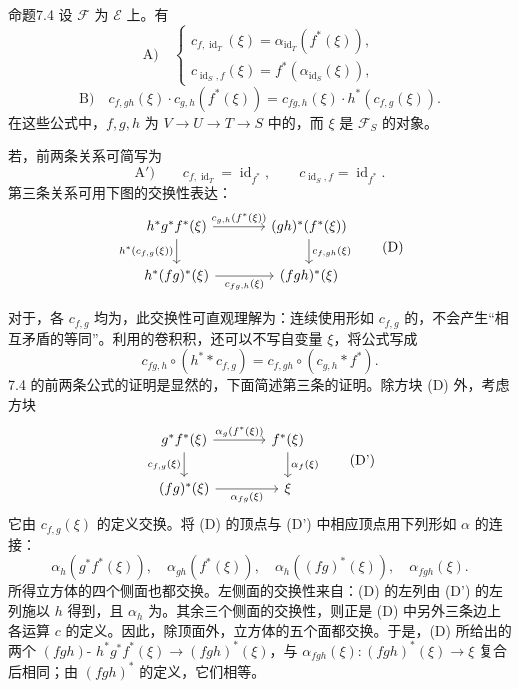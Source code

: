 \begin{SGAresult}{命题}{7.4}
设 $\mathcal F$ 为 $\mathcal E$ 上。有
\[
 \mathrm{A)}\quad
 \begin{cases}
 c_{f,\operatorname{id}_T}(\xi)=\alpha_{\operatorname{id}_T}(f^*(\xi)),\\
 c_{\operatorname{id}_S,f}(\xi)=f^*(\alpha_{\operatorname{id}_S}(\xi)),
 \end{cases}
\]
\[
 \mathrm{B)}\quad c_{f,gh}(\xi)\cdot c_{g,h}(f^*(\xi))
 =c_{fg,h}(\xi)\cdot h^*(c_{f,g}(\xi)).
\]
在这些公式中，$f,g,h$ 为 $V\to U\to T\to S$ 中的，而 $\xi$ 是 $\mathcal F_S$ 的对象。
\end{SGAresult}
若，前两条关系可简写为
\[
 \mathrm{A')}\qquad c_{f,\operatorname{id}_T}=\operatorname{id}_{f^*},\qquad
 c_{\operatorname{id}_S,f}=\operatorname{id}_{f^*}.
\]
第三条关系可用下图的交换性表达：
\[
\begin{tikzcd}[column sep=large]
 h^*g^*f^*(\xi)\arrow[r,"{c_{g,h}(f^*(\xi))}"]\arrow[d,"{h^*(c_{f,g}(\xi))}"']&
 (gh)^*(f^*(\xi))\arrow[d,"{c_{f,gh}(\xi)}"]\\
 h^*(fg)^*(\xi)\arrow[r,"{c_{fg,h}(\xi)}"']&(fgh)^*(\xi)
\end{tikzcd}\tag{D}
\]

对于，各 $c_{f,g}$ 均为，此交换性可直观理解为：连续使用形如 $c_{f,g}$ 的，不会产生“相互矛盾的等同”。利用的卷积积，还可以不写自变量 $\xi$，将公式写成
\[
 c_{fg,h}\circ(h^**c_{f,g})=c_{f,gh}\circ(c_{g,h}*f^*).
\]
7.4 的前两条公式的证明是显然的，下面简述第三条的证明。除方块 (D) 外，考虑方块
\[
\begin{tikzcd}[column sep=large]
 g^*f^*(\xi)\arrow[r,"\alpha_g(f^*(\xi))"]\arrow[d,"{c_{f,g}(\xi)}"']&
 f^*(\xi)\arrow[d,"\alpha_f(\xi)"]\\
 (fg)^*(\xi)\arrow[r,"\alpha_{fg}(\xi)"']&\xi
\end{tikzcd}\tag{D'}
\]
它由 $c_{f,g}(\xi)$ 的定义交换。将 (D) 的顶点与 (D') 中相应顶点用下列形如 $\alpha$ 的连接：
\[
 \alpha_h(g^*f^*(\xi)),\quad\alpha_{gh}(f^*(\xi)),\quad
 \alpha_h((fg)^*(\xi)),\quad\alpha_{fgh}(\xi).
\]
所得立方体的四个侧面也都交换。左侧面的交换性来自：(D) 的左列由 (D') 的左列施以 $h$ 得到，且 $\alpha_h$ 为。其余三个侧面的交换性，则正是 (D) 中另外三条边上各运算 $c$ 的定义。因此，除顶面外，立方体的五个面都交换。于是，(D) 所给出的两个 $(fgh)$- $h^*g^*f^*(\xi)\to(fgh)^*(\xi)$，与 $\alpha_{fgh}(\xi):(fgh)^*(\xi)\to\xi$ 复合后相同；由 $(fgh)^*$ 的定义，它们相等。

